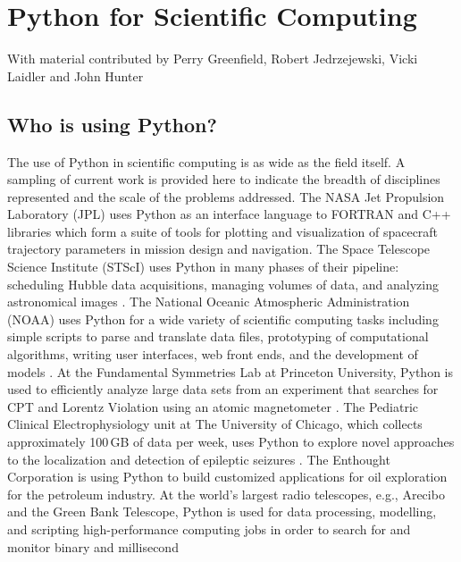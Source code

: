 
\chapter{Python for Scientific Computing}

\begin{flushright}
With material contributed by Perry Greenfield, Robert Jedrzejewski,
Vicki Laidler and John Hunter
\par\end{flushright}


\section{Who is using Python?}

The use of Python in scientific computing is as wide as the field
itself. A sampling of current work is provided here to indicate the
breadth of disciplines represented and the scale of the problems addressed.
The NASA Jet Propulsion Laboratory (JPL) uses Python as an interface
language to \textsc{FORTRAN} and C++ libraries which form a suite
of tools for plotting and visualization of spacecraft trajectory parameters
in mission design and navigation. The Space Telescope Science Institute
(STScI) uses Python in many phases of their pipeline: scheduling Hubble
data acquisitions, managing volumes of data, and analyzing astronomical
images \cite{BarrettEtal2004}. The National Oceanic Atmospheric Administration
(NOAA) uses Python for a wide variety of scientific computing tasks
including simple scripts to parse and translate data files, prototyping
of computational algorithms, writing user interfaces, web front ends,
and the development of models \cite{NOAA2000,BarkerHealy2001,ParkerHallBarker2001}.
At the Fundamental Symmetries Lab at Princeton University, Python
is used to efficiently analyze large data sets from an experiment
that searches for CPT and Lorentz Violation using an atomic magnetometer
\cite{Kornack2002,Kominis2003}. The Pediatric Clinical Electrophysiology
unit at The University of Chicago, which collects approximately 100\,GB
of data per week, uses Python to explore novel approaches to the localization
and detection of epileptic seizures \cite{HunterEtal2005}. The Enthought
Corporation is using Python to build customized applications for oil
exploration for the petroleum industry. At the world's largest radio
telescopes, e.g., Arecibo and the Green Bank Telescope, Python is
used for data processing, modelling, and scripting high-performance
computing jobs in order to search for and monitor binary and millisecond
